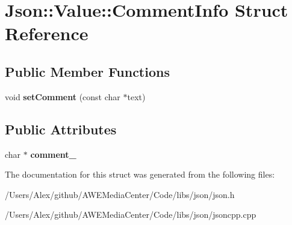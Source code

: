 \hypertarget{struct_json_1_1_value_1_1_comment_info}{\section{Json\-:\-:Value\-:\-:Comment\-Info Struct Reference}
\label{struct_json_1_1_value_1_1_comment_info}
}
\subsection*{Public Member Functions}
\begin{DoxyCompactItemize}
\item 
\hypertarget{struct_json_1_1_value_1_1_comment_info_a7ee273d42f033e237e15017dcee1bcc5}{void {\bfseries set\-Comment} (const char $\ast$text)}\label{struct_json_1_1_value_1_1_comment_info_a7ee273d42f033e237e15017dcee1bcc5}

\end{DoxyCompactItemize}
\subsection*{Public Attributes}
\begin{DoxyCompactItemize}
\item 
\hypertarget{struct_json_1_1_value_1_1_comment_info_a020f19c7098bab8ec8fec14cd1a5afb9}{char $\ast$ {\bfseries comment\-\_\-}}\label{struct_json_1_1_value_1_1_comment_info_a020f19c7098bab8ec8fec14cd1a5afb9}

\end{DoxyCompactItemize}


The documentation for this struct was generated from the following files\-:\begin{DoxyCompactItemize}
\item 
/\-Users/\-Alex/github/\-A\-W\-E\-Media\-Center/\-Code/libs/json/json.\-h\item 
/\-Users/\-Alex/github/\-A\-W\-E\-Media\-Center/\-Code/libs/json/jsoncpp.\-cpp\end{DoxyCompactItemize}
